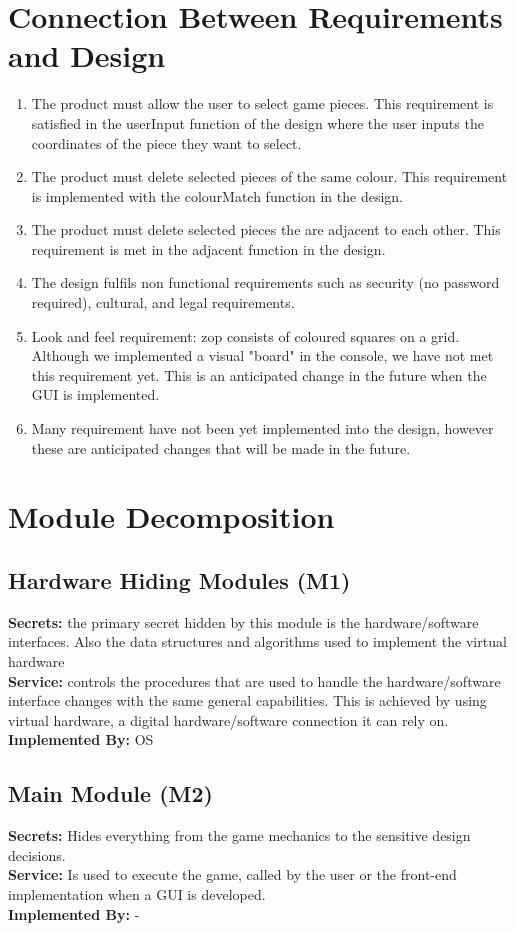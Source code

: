 \documentclass[12pt]{article}
\begin{document}
\section{Connection Between Requirements and Design}
\begin{enumerate}
 \item The product must allow the user to select game pieces.  This requirement is satisfied in the userInput function of the design where the user inputs the coordinates of the piece they want to select.
 \item The product must delete selected pieces of the same colour.  This requirement is implemented with the colourMatch function in the design.
 \item The product must delete selected pieces the are adjacent to each other.  This requirement is met in the adjacent function in the design.
 \item The design fulfils non functional requirements such as security (no password required), cultural, and legal requirements.
 \item Look and feel requirement: zop consists of coloured squares on a grid.  Although we implemented a visual "board" in the console, we have not met this requirement yet.  This is an anticipated change in the future when the GUI is implemented.
 \item Many requirement have not been yet implemented into the design, however these are anticipated changes that will be made in the future.
\end{enumerate}

\section{Module Decomposition}
\subsection{Hardware Hiding Modules (M1)}
\textbf{Secrets:} the primary secret hidden by this module is the hardware/software interfaces. Also the data structures and algorithms used to implement the virtual hardware\\
\textbf{Service:} controls the procedures that are used to handle the hardware/software interface changes with the same general capabilities. This is achieved by using virtual hardware, a digital hardware/software connection it can rely on. \\
\textbf{Implemented By:} OS

\subsection{Main Module (M2)}
\textbf{Secrets:} Hides everything from the game mechanics to the sensitive design decisions.\\
\textbf{Service:} Is used to execute the game, called by the user or the front-end implementation when a GUI is developed.\\
\textbf{Implemented By:} -
\end{document}

